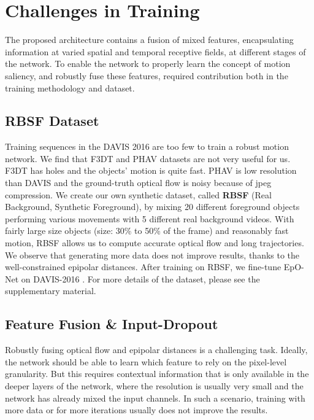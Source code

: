 \documentclass[10pt,twocolumn,letterpaper]{article}
\begin{document}
\section{Challenges in Training}
The proposed architecture contains a fusion of mixed features, encapsulating information at varied spatial and temporal receptive fields, at different stages of the network.
To enable the network to properly learn the concept of motion saliency, and robustly fuse these features, required contribution both in the training methodology and dataset.

\subsection{RBSF Dataset}
\label{sec:RBSFDataset}
Training sequences in the DAVIS 2016 are too few to train a  robust motion network. 
We find that F3DT \cite{F3DT} and PHAV \cite{PHAV} datasets are not very useful for us. F3DT has holes and the objects' motion is quite fast. PHAV is low resolution than DAVIS and the ground-truth optical flow is noisy because of jpeg compression.
We create our own synthetic dataset, called \textbf{RBSF} (Real Background, Synthetic Foreground), by mixing 20 different foreground objects performing various movements with 5 different real background videos.
With fairly large size objects (size: 30\% to 50\% of the frame) and reasonably fast motion, RBSF allows us to compute accurate optical flow and long trajectories. We observe that generating more data does not improve results, thanks to the well-constrained epipolar distances. After training on RBSF, we fine-tune EpO-Net on DAVIS-2016 \cite{DAVIS2016}. For more details of the dataset, please see the supplementary material.

\subsection{Feature Fusion \& Input-Dropout}
\label{sec:inputDropOut}
Robustly fusing optical flow and epipolar distances is a challenging task. Ideally, the network should be able to learn which feature to rely on the pixel-level granularity. But this requires contextual information that is only available in the deeper layers of the network, where the resolution is usually very small and the network has already mixed the input channels. In such a scenario, training with more data or for more iterations usually does not improve the results.
\end{document}
